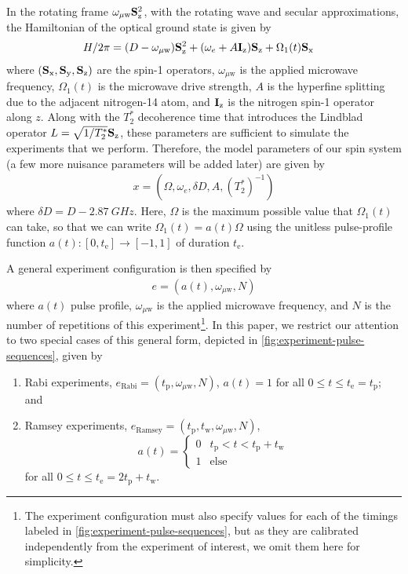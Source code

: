 \documentclass[aps,nofootinbib,twocolumn,superscriptaddress]{revtex4}
\newcommand{\mps}{x}
\newcommand{\eps}{e}
\newcommand{\Rabi}{\text{Rabi}}
\newcommand{\Ramsey}{\text{Ramsey}}
\newcommand{\te}{t_\text{e}}
\newcommand{\tp}{t_\text{p}}
\newcommand{\tw}{t_\text{w}}
\renewcommand{\H}{H}    %
\renewcommand{\L}{L}    %
\newcommand{\uw}{{\mu\text{w}}}
\begin{document}
In the rotating frame $\omega_\uw \Sz^2$,
with the rotating wave and secular approximations,
the Hamiltonian of the optical ground state is given by
\begin{align}
    \H/2\pi &= (D-\omega_\uw)\Sz^2 + (\omega_e+A \Iz)\Sz + \Omega_1(t)\Sx
\end{align}
where $(\mathbf{S}_{\text{x}},\mathbf{S}_{\text{y}},\mathbf{S}_{\text{z}})$ are the spin-1 operators, $\omega_\uw$ is the applied
microwave frequency, $\Omega_1(t)$ is the microwave drive strength, $A$ is
the hyperfine splitting  due to the adjacent nitrogen-14 atom, and $\mathbf{I}_{\text{z}}$
is the nitrogen spin-1 operator along $z$.
Along with the $T_2^*$ decoherence time that introduces the
Lindblad operator $\L=\sqrt{1/T_2^*}\Sz$, these parameters are sufficient
to simulate the experiments that we perform.
Therefore, the model parameters of our spin system (a few
more nuisance parameters will be added later) are given by
\begin{align}
    \mps=(\Omega,\omega_e,\delta D,A,(T_2^*)^{-1})
\end{align}
where $\delta D=D-\SI{2.87}{GHz}$.
Here, $\Omega$ is the maximum possible
value that $\Omega_1(t)$ can take, so that we can write
$\Omega_1(t)=a(t)\Omega$ using the unitless pulse-profile function
$a(t):[0,\te]\rightarrow [-1,1]$ of duration $\te$.

A general experiment configuration is then specified by
\begin{align}
    \eps=(a(t), \omega_\uw, N)
\end{align}
where $a(t)$ pulse profile, $\omega_\uw$ is the applied microwave frequency,
and $N$ is the number of repetitions of this experiment\footnote{The
experiment configuration must also specify values for each of the timings
labeled in \autoref{fig:experiment-pulse-sequences}, but as they are
calibrated independently from the experiment of interest, we omit
them here for simplicity.}.
In this paper, we restrict our attention to two special
cases of this general form, depicted in
\autoref{fig:experiment-pulse-sequences}, given by
\begin{enumerate}
    \item Rabi experiments, $\eps_\Rabi=(\tp,\omega_\uw, N)$,
    $a(t)=1$ for all $0\leq t\leq \te=\tp$; and
    \item Ramsey experiments, $\eps_\Ramsey=(\tp,\tw,\omega_\uw, N)$,
    \begin{equation*}
        a(t)=\begin{cases}
            0 & \tp<t<\tp+\tw\\
            1 & \text{else}
        \end{cases}
    \end{equation*}
    for all $0\leq t\leq \te=2\tp+\tw$.
\end{enumerate}
\end{document}
